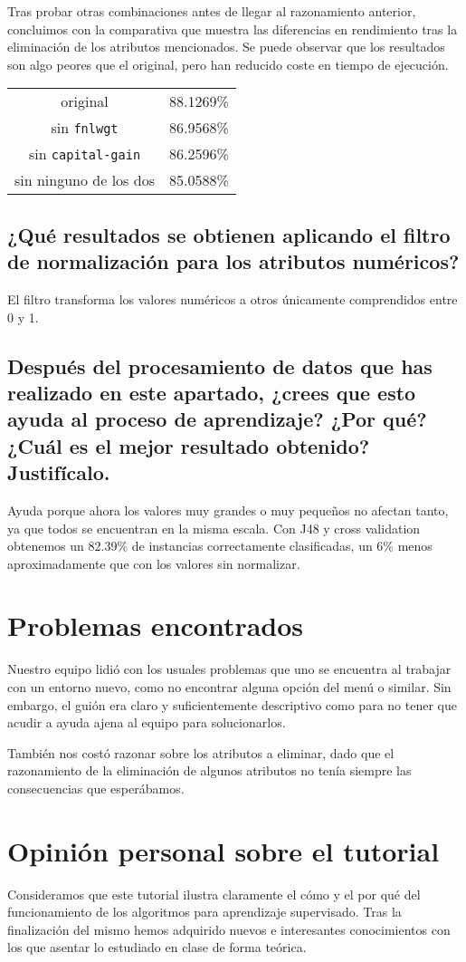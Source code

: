 \documentclass[12pt]{article}
\begin{document}
Tras probar otras combinaciones antes de llegar al razonamiento anterior, concluimos con la comparativa que muestra las diferencias en rendimiento tras la eliminación de los atributos mencionados. Se puede observar que los resultados son algo peores que el original, pero han reducido coste en tiempo de ejecución.\\

\begin{tabular}{cl}
    original & 88.1269\%\\
    sin \texttt{fnlwgt} & 86.9568\%\\
    sin \texttt{capital-gain} & 86.2596\%\\
    sin ninguno de los dos & 85.0588\%\\
\end{tabular}

\subsection*{\small ¿Qué resultados se obtienen aplicando el filtro de normalización para los atributos numéricos?}

El filtro transforma los valores numéricos a otros únicamente comprendidos entre 0 y 1.

\subsection*{\small Después del procesamiento de datos que has realizado en este apartado, ¿crees que esto ayuda al proceso de aprendizaje? ¿Por qué? ¿Cuál es el mejor resultado obtenido? Justifícalo.}

Ayuda porque ahora los valores muy grandes o muy pequeños no afectan tanto, ya que todos se encuentran en la misma escala. Con J48 y cross validation obtenemos un 82.39\% de instancias correctamente clasificadas, un 6\% menos aproximadamente que con los valores sin normalizar.

\section{Problemas encontrados}

Nuestro equipo lidió con los usuales problemas que uno se encuentra al trabajar con un entorno nuevo, como no encontrar alguna opción del menú o similar. Sin embargo, el guión era claro y suficientemente descriptivo como para no tener que acudir a ayuda ajena al equipo para solucionarlos.

También nos costó razonar sobre los atributos a eliminar, dado que el razonamiento de la eliminación de algunos atributos no tenía siempre las consecuencias que esperábamos.

\section{Opinión personal sobre el tutorial}

Consideramos que este tutorial ilustra claramente el cómo y el por qué del funcionamiento de los algoritmos para aprendizaje supervisado. Tras la finalización del mismo hemos adquirido nuevos e interesantes conocimientos con los que asentar lo estudiado en clase de forma teórica.
\end{document}
